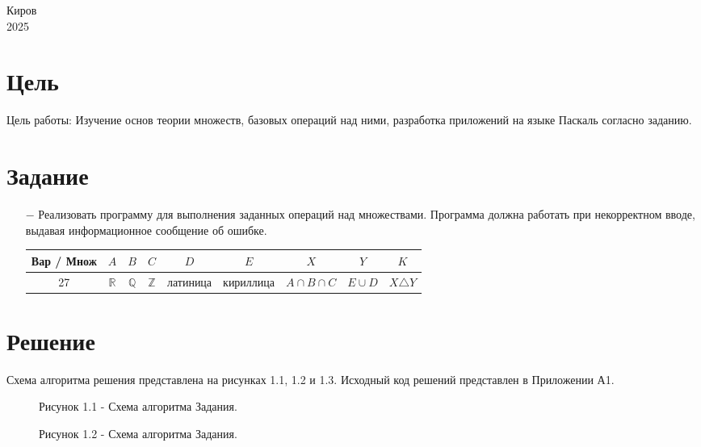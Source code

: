 \documentclass[oneside,a4paper,14pt]{extarticle}
\begin{document}
\begin{center}
	Киров\\
	2025
\end{center}

\newpage\thispagestyle{plain}

\section*{Цель}

Цель работы: Изучение основ теории множеств, базовых операций над ними, разработка приложений на языке Паскаль согласно заданию.

\section*{Задание}
\begin{itemize}
	\item[$-$] Реализовать программу для выполнения заданных операций над множествами. Программа должна работать при некорректном вводе, выдавая информационное сообщение об ошибке.
	
	\begin{tabular}{|c|c|c|c|c|c|c|c|c|}
		\hline
		Вар / Множ & $A$  & $B$  & $C$  & $D$      & $E$       & $X$               & $Y$      & $K$             \\
		\hline
		27         & $\mathbb{R}$ & $\mathbb{Q}$ & $\mathbb{Z}$ & латиница & кириллица & $A \cap B \cap C$ & $E \cup D$ & $X \triangle Y$ \\
		\hline
		\end{tabular}
\end{itemize}

\section*{Решение}

Схема алгоритма решения представлена на рисунках 1.1, 1.2 и 1.3. Исходный код решений представлен в Приложении А1.

\clearpage
\begin{figure}[H]
	\centering
	\caption*{Рисунок 1.1 - Схема алгоритма Задания.}
\end{figure}

\clearpage
\begin{figure}[H]
	\centering
	\caption*{Рисунок 1.2 - Схема алгоритма Задания.}
\end{figure}
\end{document}
